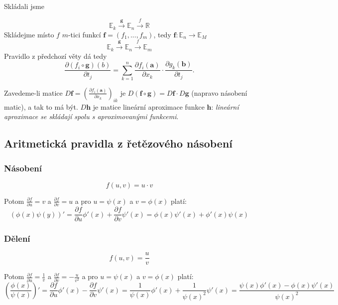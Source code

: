 \documentclass[../main.tex]{subfiles}
\begin{document}
Skládali jsme

\[\mathbb{E}_k \xrightarrow{\mathbf{g}} \mathbb{E}_n \xrightarrow{\textit{f}} \mathbb{R} \]
Skládejme místo $f$ $m$-tici funkcí
$\mathbf{f} = (f_1,...,f_m)$, tedy $\mathbf{f}: \mathbb{E}_n \rightarrow \mathbb{E}_M$
\[\mathbb{E}_k \xrightarrow{\mathbf{g}} \mathbb{E}_n \xrightarrow{\textit{f}} \mathbb{E}_m \]
Pravidlo z předchozí věty dá tedy
\[\frac{\partial (f_i \circ \mathbf{g})(b)}{\partial t_j} = \sum^n_{k=1} \frac{\partial f_i(\mathbf{a})}{\partial x_k}
\cdot \frac{\partial g_k(\mathbf{b})}{\partial t_j}.\]

Zavedeme-li matice $D\mathbf{f} = \left(\frac{\partial f_i(\mathbf{a})}{\partial x_k}\right)_{ik}$ je 
$D(\mathbf{f}\circ \mathbf{g}) = D\mathbf{f}\cdot D\mathbf{g}$ (napravo násobení matic), a tak to má být. $D\mathbf{h}$ je matice lineární aproximace 
funkce $\mathbf{h}$: \textit{lineární aproximace se skládají spolu s aproximovanými funkcemi}.
\noindent

\subsection{Aritmetická pravidla z řetězového násobení}
\subsubsection{Násobení}
\[ f(u,v) = u \cdot v \]

\hspace{1.2mm}
\noindent
Potom $ \frac{\partial f}{\partial u} = v $ a $ \frac{\partial f}{\partial v} = u $
a pro $u = \psi (x)$ a $ v = \phi (x) $ platí:
\[ (\phi (x) \psi (y))' =
\frac{\partial f}{\partial u} \phi '(x) + \frac{\partial f}{\partial v} \psi '(x) = 
\phi (x)\psi '(x) + \phi '(x)\psi (x)  \]

\subsubsection{Dělení}
\[ f(u,v) = \frac{u}{v} \]

\hspace{1.2mm}
\noindent
Potom $ \frac{\partial f}{\partial u} = \frac{1}{v} $ a $ \frac{\partial f}{\partial v} = -\frac{u}{v^2} $
a pro $u = \psi (x)$ a $ v = \phi (x) $ platí:
\[ \left( \frac{\phi (x)}{\psi (x)} \right)' =
\frac{\partial f}{\partial u} \phi '(x) - \frac{\partial f}{\partial v} \psi '(x) =
\frac{1}{\psi (x)} \phi '(x) + \frac{1}{\psi (x)^2}\psi '(x) =
\frac{\psi (x)\phi '(x) - \phi (x)\psi '(x)}{\psi (x)^2} \]
\end{document}
